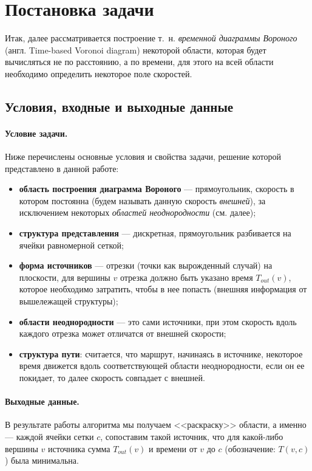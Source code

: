 \documentclass[12pt]{article}
\begin{document}
\section{Постановка задачи}
\label{task}
Итак, далее рассматривается построение т.~н. \emph{временной диаграммы Вороного}
(англ. Time-based Voronoi diagram) некоторой области, которая будет 
вычисляться не по расстоянию, а по времени, для этого на всей области
необходимо определить некоторое поле скоростей.

\subsection{Условия, входные и выходные данные}
\label{props}

\paragraph{Условие задачи.} Ниже перечислены
основные условия и свойства задачи, решение которой представлено в данной работе:
\begin{itemize}
\item \textbf{область построения диаграмма Вороного} --- прямоугольник, 
скорость в котором постоянна (будем называть данную скорость \emph{внешней}), за 
исключением некоторых \emph{областей неоднородности} (см. далее);
\item \textbf{структура представления} --- дискретная, прямоугольник разбивается на 
ячейки равномерной сеткой;
\item \textbf{форма источников} --- отрезки (точки как вырожденный случай)
на плоскости, для вершины $v$ отрезка должно быть указано время $T_{out}(v)$, 
которое необходимо  затратить, 
чтобы в нее попасть (внешняя информация от вышележащей структуры);
\item \textbf{области неоднородности} --- это сами источники, 
при этом скорость вдоль каждого отрезка может отличатся от
внешней скорости;
\item \textbf{структура пути}: считается, что маршрут, начинаясь в источнике,
некоторое время движется вдоль соответствующей области неоднородности,
если он ее покидает, то далее скорость совпадает с внешней.
\end{itemize}

\paragraph{Выходные данные.}
В результате работы алгоритма мы получаем <<раскраску>> области, 
а именно --- каждой ячейки сетки $c$, сопоставим такой источник, 
что для какой-либо вершины $v$ источника сумма $T_{out}(v)$ и времени от 
$v$ до $c$ (обозначение: $T(v, c)$) была минимальна.
\end{document}
